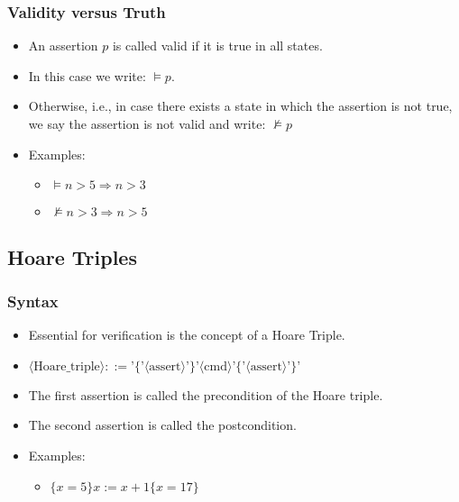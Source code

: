 \begin{multicols}{2}
\subsubsection{Validity versus Truth}
\begin{itemize}
  \item An assertion $p$ is called valid if it is true in all states.
  \item In this case we write: $\models p$.
  \item Otherwise, i.e., in case there exists a state in which the assertion is not true, we say the assertion is not valid and write: $\nvDash p$
  \item Examples:
  \begin{itemize}
    \item $\models n > 5 \Rightarrow n > 3$
    \item $\nvDash n > 3 \Rightarrow n > 5$
  \end{itemize}
\end{itemize}

\subsection{Hoare Triples}
\subsubsection{Syntax}
\begin{itemize}
  \item Essential for verification is the concept of a Hoare Triple.
  \item $\langle \text{Hoare\_triple} \rangle ::= \text{'}\{\text{'} \langle \text{assert} \rangle \text{'}\}\text{'} \langle \text{cmd} \rangle \text{'}\{\text{'} \langle \text{assert} \rangle \text{'}\}\text{'}$
  \item The first assertion is called the precondition of the Hoare triple.
  \item The second assertion is called the postcondition.
  \item Examples:
  \begin{itemize}
    \item $\{ x = 5 \} x := x + 1 \{ x = 17 \}$
  \end{itemize}
\end{itemize}


\end{multicols}
